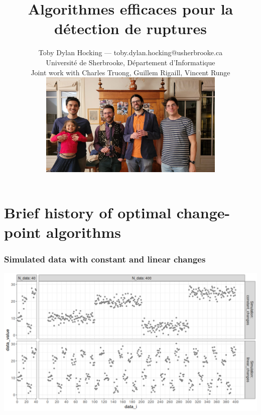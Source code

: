 \documentclass{beamer}
\begin{document}
\title{Algorithmes efficaces pour la détection de ruptures}

\author{
  Toby Dylan Hocking --- toby.dylan.hocking@usherbrooke.ca\\ 
  Université de Sherbrooke, Département d'Informatique\\
  Joint work with Charles Truong, Guillem Rigaill, Vincent Runge\\
  \includegraphics[height=5cm]{2025-01-photo-charles-toby-guillem-vincent.jpg}
}

\date{}

\maketitle

\section{Brief history of optimal change-point algorithms}

\begin{frame}
  \frametitle{Simulated data with constant and linear changes}
  \includegraphics[width=\textwidth]{figure-sim-linear-constant-changes.png}
\end{frame}
\end{document}
